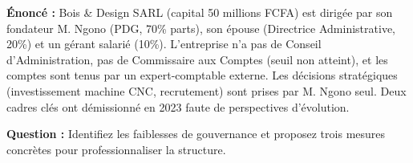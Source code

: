 \documentclass[11pt]{article}
\begin{document}
\begin{exoresolu}
\textbf{Énoncé :} Bois \& Design SARL (capital 50 millions FCFA) est dirigée par son fondateur M. Ngono (PDG, 70\% parts), son épouse (Directrice Administrative, 20\%) et un gérant salarié (10\%). L'entreprise n'a pas de Conseil d'Administration, pas de Commissaire aux Comptes (seuil non atteint), et les comptes sont tenus par un expert-comptable externe. Les décisions stratégiques (investissement machine CNC, recrutement) sont prises par M. Ngono seul. Deux cadres clés ont démissionné en 2023 faute de perspectives d'évolution.

\textbf{Question :} Identifiez les faiblesses de gouvernance et proposez trois mesures concrètes pour professionnaliser la structure.


\end{exoresolu}
\end{document}
